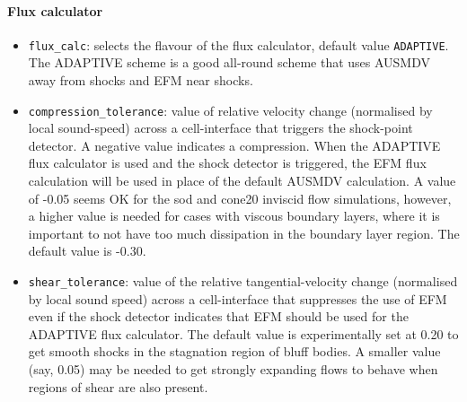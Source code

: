 \paragraph{Flux calculator}
\begin{itemize}
\item \texttt{flux\_calc}: selects the flavour of the flux calculator, 
  default value \texttt{ADAPTIVE}.
  The ADAPTIVE scheme is a good all-round scheme that uses AUSMDV away from
  shocks and EFM near shocks.
\item \texttt{compression\_tolerance}: value of relative velocity change (normalised by local sound-speed)
   across a cell-interface that triggers the shock-point detector.  A negative value indicates a compression.
   When the ADAPTIVE flux calculator is used and the shock detector is triggered, the EFM flux calculation
   will be used in place of the default AUSMDV calculation.
   A value of -0.05 seems OK for the sod and cone20 inviscid flow simulations, however,
   a higher value is needed for cases with viscous boundary layers, 
   where it is important to not have too much dissipation in the boundary layer region.
   The default value is -0.30.
\item \texttt{shear\_tolerance}: value of the relative tangential-velocity change 
   (normalised by local sound speed) across a cell-interface that suppresses the use of EFM even if the
   shock detector indicates that EFM should be used for the ADAPTIVE flux calculator.
   The default value is experimentally set at 0.20 to get smooth shocks
   in the stagnation region of bluff bodies.
   A smaller value (say, 0.05) may be needed to get strongly expanding flows to behave 
   when regions of shear are also present.
\end{itemize}

